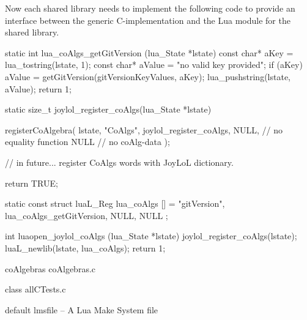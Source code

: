 Now each shared library needs to implement the following code to provide 
an interface between the generic C-implementation and the Lua module for 
the shared library. 

\startCCode
static int lua_coAlgs_getGitVersion (lua_State *lstate) {
  const char* aKey   = lua_tostring(lstate, 1);
  const char* aValue = "no valid key provided";
  if (aKey) aValue = getGitVersion(gitVersionKeyValues, aKey);
  lua_pushstring(lstate, aValue);
  return 1;
}

static size_t joylol_register_coAlgs(lua_State *lstate) {
  registerCoAlgebra(
    lstate,
    "CoAlgs",
    joylol_register_coAlgs,
    NULL, // no equality function
    NULL  // no coAlg-data
  );
  
  // in future... register CoAlgs words with JoyLoL dictionary. 
  
  return TRUE;
}

static const struct luaL_Reg lua_coAlgs [] = {
  {"gitVersion", lua_coAlgs_getGitVersion},
  {NULL, NULL}
};

int luaopen_joylol_coAlgs (lua_State *lstate) {
  joylol_register_coAlgs(lstate);
  luaL_newlib(lstate, lua_coAlgs);
  return 1;
}
\stopCCode

\createCCodeFile%
  {coAlgebras}%
  {coAlgebras.c}%
  {}

\createCTestFile%
  {class}%
  {allCTests.c}%
  {}





\createLmsfileFile%
  {default}%
  {lmsfile}%
  {-- A Lua Make System file}

